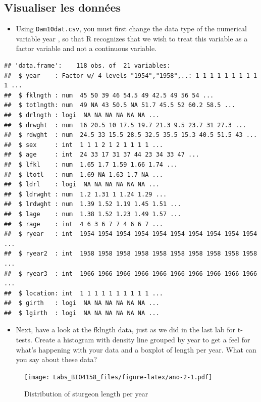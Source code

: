 \documentclass[
  12pt,
]{book}
\providecommand{\tightlist}{%
  \setlength{\itemsep}{0pt}\setlength{\parskip}{0pt}}
\begin{document}
\hypertarget{visualiser-les-donnuxe9es}{%
\subsection{Visualiser les données}\label{visualiser-les-donnuxe9es}}

\begin{itemize}
\tightlist
\item
  Using \texttt{Dam10dat.csv}, you must first change the data type of the
  numerical variable year , so that R recognizes that we wish to treat this
  variable as a factor variable and not a continuous variable.
\end{itemize}

\begin{verbatim}
## 'data.frame':    118 obs. of  21 variables:
##  $ year    : Factor w/ 4 levels "1954","1958",..: 1 1 1 1 1 1 1 1 1 1 ...
##  $ fklngth : num  45 50 39 46 54.5 49 42.5 49 56 54 ...
##  $ totlngth: num  49 NA 43 50.5 NA 51.7 45.5 52 60.2 58.5 ...
##  $ drlngth : logi  NA NA NA NA NA NA ...
##  $ drwght  : num  16 20.5 10 17.5 19.7 21.3 9.5 23.7 31 27.3 ...
##  $ rdwght  : num  24.5 33 15.5 28.5 32.5 35.5 15.3 40.5 51.5 43 ...
##  $ sex     : int  1 1 1 2 1 2 1 1 1 1 ...
##  $ age     : int  24 33 17 31 37 44 23 34 33 47 ...
##  $ lfkl    : num  1.65 1.7 1.59 1.66 1.74 ...
##  $ ltotl   : num  1.69 NA 1.63 1.7 NA ...
##  $ ldrl    : logi  NA NA NA NA NA NA ...
##  $ ldrwght : num  1.2 1.31 1 1.24 1.29 ...
##  $ lrdwght : num  1.39 1.52 1.19 1.45 1.51 ...
##  $ lage    : num  1.38 1.52 1.23 1.49 1.57 ...
##  $ rage    : int  4 6 3 6 7 7 4 6 6 7 ...
##  $ ryear   : int  1954 1954 1954 1954 1954 1954 1954 1954 1954 1954 ...
##  $ ryear2  : int  1958 1958 1958 1958 1958 1958 1958 1958 1958 1958 ...
##  $ ryear3  : int  1966 1966 1966 1966 1966 1966 1966 1966 1966 1966 ...
##  $ location: int  1 1 1 1 1 1 1 1 1 1 ...
##  $ girth   : logi  NA NA NA NA NA NA ...
##  $ lgirth  : logi  NA NA NA NA NA NA ...
\end{verbatim}

\begin{itemize}
\tightlist
\item
  Next, have a look at the fklngth data, just as we did in the last lab for t-tests. Create a histogram with density line grouped by year to get a feel for what's happening with your data and a boxplot of length per year. What can you say about these data?
\end{itemize}

\begin{figure}
\centering
\texttt{[image: Labs\_BIO4158\_files/figure-latex/ano-2-1.pdf]}
\caption{\label{fig:ano-2}Distribution of sturgeon length per year}
\end{figure}
\end{document}
